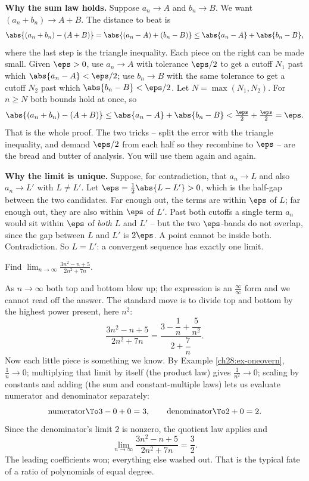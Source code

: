 \begin{whybox}
\textbf{Why the sum law holds.} Suppose $a_n \to A$ and $b_n \to B$. We want
$(a_n + b_n) \to A + B$. The distance to beat is
\[
  \abs{(a_n + b_n) - (A + B)} = \abs{(a_n - A) + (b_n - B)}
    \le \abs{a_n - A} + \abs{b_n - B},
\]
where the last step is the triangle inequality. Each piece on the right can be
made small. Given $\eps > 0$, use $a_n \to A$ with tolerance $\eps/2$ to get a
cutoff $N_1$ past which $\abs{a_n - A} < \eps/2$; use $b_n \to B$ with the same
tolerance to get a cutoff $N_2$ past which $\abs{b_n - B} < \eps/2$. Let $N =
\max(N_1, N_2)$. For $n \ge N$ both bounds hold at once, so
\[
  \abs{(a_n + b_n) - (A+B)} \le \abs{a_n - A} + \abs{b_n - B}
    < \tfrac\eps2 + \tfrac\eps2 = \eps .
\]
That is the whole proof. The two tricks -- split the error with the triangle
inequality, and demand $\eps/2$ from each half so they recombine to $\eps$ -- are
the bread and butter of analysis. You will use them again and again.
\end{whybox}

\begin{whybox}
\textbf{Why the limit is unique.} Suppose, for contradiction, that $a_n \to L$
and also $a_n \to L'$ with $L \ne L'$. Let $\eps = \tfrac12\abs{L - L'} > 0$,
which is the half-gap between the two candidates. Far enough out, the terms are
within $\eps$ of $L$; far enough out, they are also within $\eps$ of $L'$. Past
both cutoffs a single term $a_n$ would sit within $\eps$ of \emph{both} $L$ and
$L'$ -- but the two $\eps$-bands do not overlap, since the gap between $L$ and
$L'$ is $2\eps$. A point cannot be inside both. Contradiction. So $L = L'$: a
convergent sequence has exactly one limit.
\end{whybox}

\begin{example}
\label{ch28:ex-rational}
Find $\displaystyle\lim_{n\to\infty} \frac{3n^2 - n + 5}{2n^2 + 7n}$.

As $n \to \infty$ both top and bottom blow up; the expression is an
$\tfrac{\infty}{\infty}$ form and we cannot read off the answer. The standard
move is to divide top and bottom by the highest power present, here $n^2$:
\[
  \frac{3n^2 - n + 5}{2n^2 + 7n}
  = \frac{3 - \dfrac{1}{n} + \dfrac{5}{n^2}}{2 + \dfrac{7}{n}} .
\]
Now each little piece is something we know. By Example
\ref{ch28:ex-oneovern}, $\tfrac1n \to 0$; multiplying that limit by itself (the
product law) gives $\tfrac{1}{n^2} \to 0$; scaling by constants and adding
(the sum and constant-multiple laws) lets us evaluate numerator and denominator
separately:
\[
  \text{numerator} \To 3 - 0 + 0 = 3,
  \qquad
  \text{denominator} \To 2 + 0 = 2 .
\]
Since the denominator's limit $2$ is nonzero, the quotient law applies and
\[
  \lim_{n\to\infty} \frac{3n^2 - n + 5}{2n^2 + 7n} = \frac{3}{2}.
\]
The leading coefficients won; everything else washed out. That is the typical
fate of a ratio of polynomials of equal degree.
\end{example}

